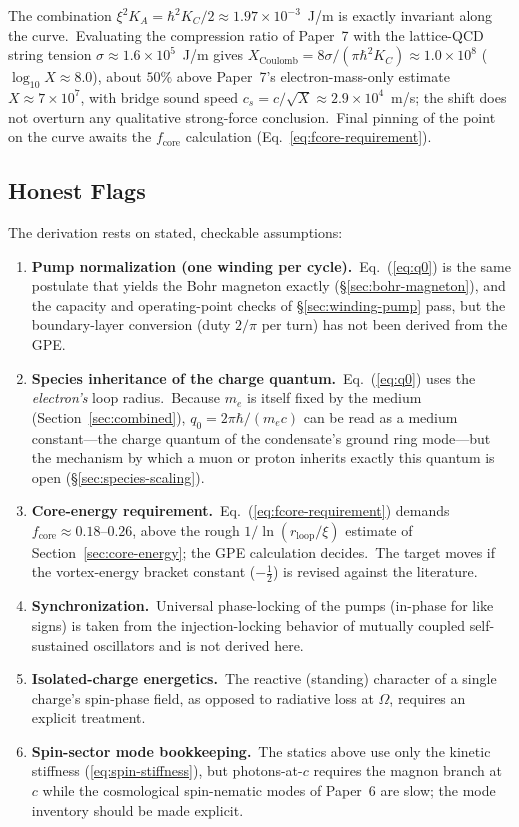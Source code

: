 \documentclass[12pt,letterpaper]{article}
\newcommand{\Ka}{K_{\!A}}
\newcommand{\rloop}{r_{\mathrm{loop}}}
\begin{document}
The combination
$\xi^2 \Ka = \hbar^2 K_C/2 \approx 1.97\times10^{-3}$~J/m is exactly
invariant along the curve.\ Evaluating the compression ratio of Paper~7
with the lattice-QCD string tension
$\sigma \approx 1.6\times10^{5}$~J/m gives
$X_{\mathrm{Coulomb}} = 8\sigma/(\pi\hbar^2 K_C) \approx 1.0\times10^{8}$
($\log_{10} X \approx 8.0$), about $50\%$ above Paper~7's
electron-mass-only estimate $X \approx 7\times10^{7}$, with bridge sound
speed $c_s = c/\sqrt{X} \approx 2.9\times10^{4}$~m/s; the shift does not
overturn any qualitative strong-force conclusion.\ Final pinning of the
point on the curve awaits the $f_{\mathrm{core}}$ calculation
(Eq.~\ref{eq:fcore-requirement}).

\subsection{Honest Flags}
\label{sec:k-flags}

The derivation rests on stated, checkable assumptions:

\begin{enumerate}[leftmargin=2em]
  \item \textbf{Pump normalization (one winding per cycle).}\
    Eq.~(\ref{eq:q0}) is the same postulate that yields the Bohr
    magneton exactly (§\ref{sec:bohr-magneton}), and the capacity and
    operating-point checks of §\ref{sec:winding-pump} pass, but the
    boundary-layer conversion (duty $2/\pi$ per turn) has not been
    derived from the GPE.
  \item \textbf{Species inheritance of the charge quantum.}\
    Eq.~(\ref{eq:q0}) uses the \emph{electron's} loop radius.\ Because
    $m_e$ is itself fixed by the medium (Section~\ref{sec:combined}),
    $q_0 = 2\pi\hbar/(m_e c)$ can be read as a medium constant---the
    charge quantum of the condensate's ground ring mode---but the
    mechanism by which a muon or proton inherits exactly this quantum
    is open (§\ref{sec:species-scaling}).
  \item \textbf{Core-energy requirement.}\
    Eq.~(\ref{eq:fcore-requirement}) demands
    $f_{\mathrm{core}} \approx 0.18$--$0.26$, above the rough
    $1/\ln(\rloop/\xi)$ estimate of Section~\ref{sec:core-energy}; the
    GPE calculation decides.\ The target moves if the vortex-energy
    bracket constant ($-\tfrac12$) is revised against the literature.
  \item \textbf{Synchronization.}\ Universal phase-locking of the pumps
    (in-phase for like signs) is taken from the injection-locking
    behavior of mutually coupled self-sustained oscillators and is not
    derived here.
  \item \textbf{Isolated-charge energetics.}\ The reactive (standing)
    character of a single charge's spin-phase field, as opposed to
    radiative loss at $\Omega$, requires an explicit treatment.
  \item \textbf{Spin-sector mode bookkeeping.}\ The statics above use
    only the kinetic stiffness (\ref{eq:spin-stiffness}), but
    photons-at-$c$ requires the magnon branch at $c$ while the
    cosmological spin-nematic modes of Paper~6 are slow; the mode
    inventory should be made explicit.
\end{enumerate}
\end{document}

